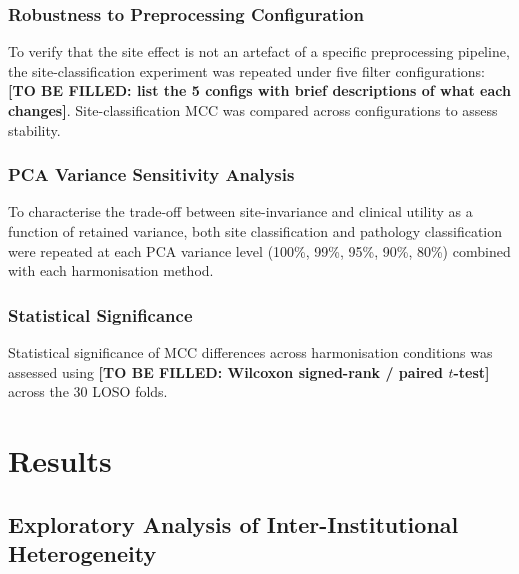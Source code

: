 \documentclass[preprint,12pt]{elsarticle}
\begin{document}
\subsubsection{Robustness to Preprocessing Configuration}
\label{subsubsec:filter_robustness_eval}

To verify that the site effect is not an artefact of a specific
preprocessing pipeline, the site-classification experiment was
repeated under five filter configurations:
\textbf{[TO BE FILLED: list the 5 configs with brief descriptions of
what each changes]}.
Site-classification MCC was compared across configurations to assess
stability.

\subsubsection{PCA Variance Sensitivity Analysis}
\label{subsubsec:pca_sweep_eval}

To characterise the trade-off between site-invariance and clinical
utility as a function of retained variance, both site classification
and pathology classification were repeated at each PCA variance level
(100\%, 99\%, 95\%, 90\%, 80\%) combined with each harmonisation
method.

\subsubsection{Statistical Significance}
\label{subsubsec:statistical_tests}

Statistical significance of MCC differences across harmonisation
conditions was assessed using \textbf{[TO BE FILLED: Wilcoxon
signed-rank / paired $t$-test]} across the 30 LOSO folds.

\section{Results}
\label{sec:results}

\subsection{Exploratory Analysis of Inter-Institutional Heterogeneity}
\label{subsec:exploratory}
\end{document}
